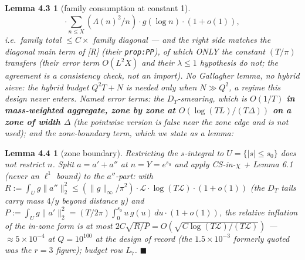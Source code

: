\documentclass[11pt]{amsart}
\theoremstyle{plain}
\newtheorem*{lemmafourthree}{Lemma 4.3}
\newtheorem*{lemmafourfour}{Lemma 4.4}
\theoremstyle{remark}
\begin{document}
\begin{lemmafourthree}[family consumption at constant 1]
\[\cdot\sum_{n\le X} (\Lambda(n)^2/n)\cdot g(\log n)\cdot(1 + o(1)),
\]
i.e.\ family total $\le C \times$ family diagonal --- and the right side matches the
diagonal main term of [R] (their \texttt{prop:PP}), of which ONLY the constant
$(T/\pi)$ transfers (their error term $O(L^2X)$ and their $\lambda \le 1$ hypothesis
do not; the agreement is a consistency check, not an import). No Gallagher lemma, no
hybrid sieve: the hybrid budget $Q^2T + N$ is needed only when $N \gg Q^2$, a regime
this design never enters. Named error terms: the $D_T$-smearing, which is $O(1/T)$
\textbf{in mass-weighted aggregate, zone by zone at $O(\log(TL)/(T\Delta))$ on a zone
of width $\Delta$} (the pointwise version is false near the zone edge and is not
used); and the zone-boundary term, which we state as a lemma:
\end{lemmafourthree}

\begin{lemmafourfour}[zone boundary]
Restricting the $s$-integral to $U = \{|s| \le s_0\}$ does not restrict $n$. Split
$a = a' + a''$ at $n = Y = e^{s_0}$ and apply CS-in-$\chi$ + Lemma 6.1 (never an
$\ell^1$ bound) to the $a''$-part: with $R := \int_U g\lVert a''\rVert_2^2 \le
(\lVert g\rVert_\infty/\pi^2)\cdot\mathcal{L}\cdot\log(T\mathcal{L})\cdot(1+o(1))$
(the $D_T$ tails carry mass $4/y$ beyond distance $y$) and
$P := \int_U g\lVert a'\rVert_2^2 = (T/2\pi)\int_0^{s_0} u\, g(u)\, du\cdot(1+o(1))$,
the relative inflation of the in-zone form is at most
$2C\sqrt{R/P} = O(\sqrt{C \log(T\mathcal{L})/(T\mathcal{L})})$ ---
$\approx 5\times10^{-4}$ at $Q = 10^{100}$ at the design of record (the
$1.5\times10^{-3}$ formerly quoted was the $r = 3$ figure); budget row $L_7$.
$\blacksquare$
\end{lemmafourfour}
\end{document}
